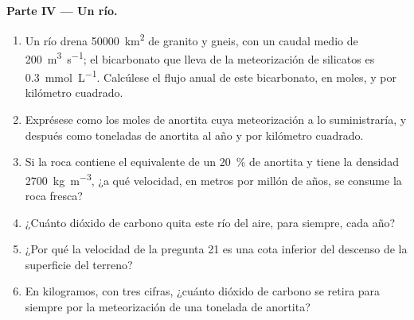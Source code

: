 \begin{problem}
\medskip
\noindent\textbf{Parte IV --- Un río.}
\begin{enumerate}[resume]
  \item Un río drena \qty{50000}{km^2} de granito y gneis, con un caudal medio de \qty{200}{m^3.s^{-1}}; el bicarbonato que lleva de la
        meteorización de silicatos es \qty{0.3}{mmol.L^{-1}}. Calcúlese el flujo anual de este bicarbonato, en moles, y por kilómetro cuadrado.
  \item Exprésese como los moles de anortita cuya meteorización a  lo suministraría, y después como toneladas de anortita al año y
        por kilómetro cuadrado.
  \item Si la roca contiene el equivalente de un \qty{20}{\percent} de anortita y tiene la densidad \qty{2700}{kg.m^{-3}}, ¿a qué velocidad, en
        metros por millón de años, se consume la roca fresca?
  \item ¿Cuánto dióxido de carbono quita este río del aire, para siempre, cada año?
  \item ¿Por qué la velocidad de la pregunta 21 es una cota inferior del descenso de la superficie del terreno?
  \item En kilogramos, con tres cifras, ¿cuánto dióxido de carbono se retira para siempre por la meteorización de una tonelada de anortita?
\end{enumerate}
\end{problem}
